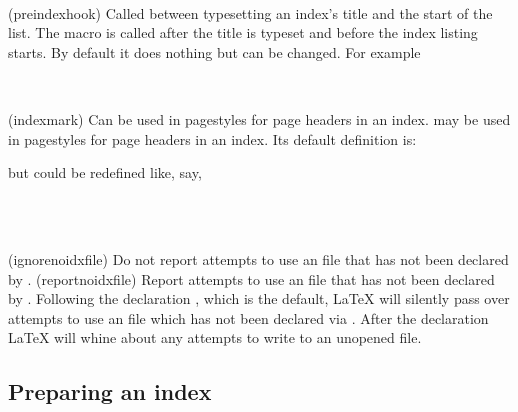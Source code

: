 \begin{syntax}
\cmd{\preindexhook} \\
\end{syntax}
\glossary(preindexhook)%
  {}%
  {Called between typesetting an index's title and the start of the list.}
    The macro \cmd{\preindexhook} 
is called after the title is typeset and
before the index listing starts. By default it does nothing but
can be changed. For example
\begin{lcode}
\renewcommand{\preindexhook}{Bold page numbers are used 
  to indicate the main reference for an entry.}
\end{lcode}

\begin{syntax}
\cmd{\indexmark} \\
\end{syntax}
\glossary(indexmark)%
  {}%
  {Can be used in pagestyles for page headers in an index.}
 may be used in pagestyles for page headers in an index.
Its default definition is: 
\begin{lcode}
\newcommand*{\indexmark}{}
\end{lcode}
but could be redefined like, say,
\begin{lcode}
\renewcommand*{\indexmark}{\markboth{\indexname}{\indexname}}
\end{lcode}




\begin{syntax}
\cmd{\ignorenoidxfile} \\
\cmd{\reportnoidxfile} \\
\end{syntax}
\glossary(ignorenoidxfile)%
  {}%
  {Do not report attempts to use an  file that has not been
   declared by .}
\glossary(reportnoidxfile)%
  {}%
  {Report attempts to use an  file that has not been
   declared by .}
Following the declaration \cmd{\ignorenoidxfile}, which is the default,
LaTeX will silently pass over attempts to use an  file which has
not been declared via \cmd{\makeindex}. After the declaration
\cmd{\reportnoidxfile} LaTeX will whine about any attempts to 
write to an unopened file.


\subsection{Preparing an index}

